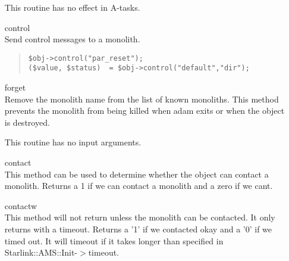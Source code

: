 \documentclass[twoside,11pt]{article}
\newenvironment{myquote}{\begin{quote}\begin{small}}{\end{small}\end{quote}}
\renewcommand{\_}{\texttt{\symbol{95}}}
\begin{document}
\begin{itemize}
This routine has no effect in A-tasks.

\item[control]%
%
\hfil\\
Send control messages to a monolith.
\begin{myquote}
\begin{verbatim}
$obj->control("par_reset");
($value, $status)  = $obj->control("default","dir");
\end{verbatim}
\end{myquote}

\item[forget]%
%
\hfil\\
Remove the monolith name from the list of known monoliths.
This method prevents the monolith from being killed when adam
exits or when the object is destroyed.

This routine has no input arguments. 

\item[contact]%
%
\hfil\\
This method can be used to determine whether the object can
contact a monolith. Returns a 1 if we can contact a monolith and
a zero if we cant.

\item[contactw]%
%
\hfil\\
This method will not return unless the monolith can be contacted.
It only returns with a timeout. Returns a '1' if we contacted okay
and a '0' if we timed out. It will timeout if it takes longer than
specified in Starlink::AMS::Init-$>$timeout.

\end{itemize}



\end{document}

